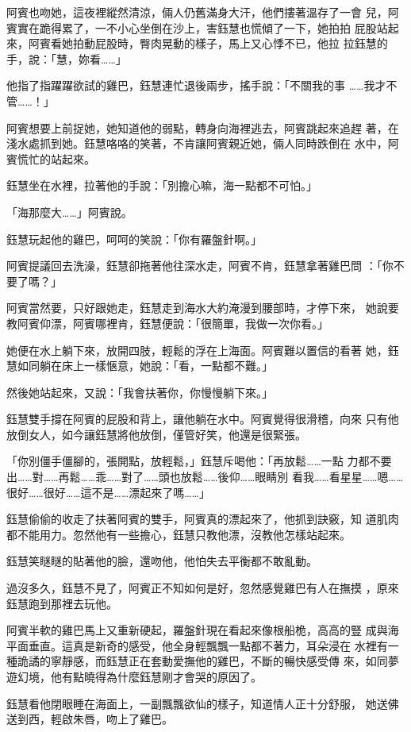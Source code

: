 阿賓也吻她，這夜裡縱然清涼，倆人仍舊滿身大汗，他們摟著溫存了一會
兒，阿賓實在跪得累了，一不小心坐倒在沙上，害鈺慧也慌傾了一下，她拍拍
屁股站起來，阿賓看她拍動屁股時，臀肉晃動的樣子，馬上又心悸不已，他拉
拉鈺慧的手，說：「慧，妳看……」

他指了指躍躍欲試的雞巴，鈺慧連忙退後兩步，搖手說：「不關我的事
……我才不管……！」

阿賓想要上前捉她，她知道他的弱點，轉身向海裡逃去，阿賓跳起來追趕
著，在淺水處抓到她。鈺慧咯咯的笑著，不肯讓阿賓親近她，倆人同時跌倒在
水中，阿賓慌忙的站起來。

鈺慧坐在水裡，拉著他的手說：「別擔心嘛，海一點都不可怕。」

「海那麼大……」阿賓說。

鈺慧玩起他的雞巴，呵呵的笑說：「你有羅盤針啊。」

阿賓提議回去洗澡，鈺慧卻拖著他往深水走，阿賓不肯，鈺慧拿著雞巴問
：「你不要了嗎？」

阿賓當然要，只好跟她走，鈺慧走到海水大約淹漫到腰部時，才停下來，
她說要教阿賓仰漂，阿賓哪裡肯，鈺慧便說：「很簡單，我做一次你看。」

她便在水上躺下來，放開四肢，輕鬆的浮在上海面。阿賓難以置信的看著
她，鈺慧如同躺在床上一樣愜意，她說：「看，一點都不難。」

然後她站起來，又說：「我會扶著你，你慢慢躺下來。」

鈺慧雙手撐在阿賓的屁股和背上，讓他躺在水中。阿賓覺得很滑稽，向來
只有他放倒女人，如今讓鈺慧將他放倒，僅管好笑，他還是很緊張。

「你別僵手僵腳的，張開點，放輕鬆，」鈺慧斥喝他：「再放鬆……一點
力都不要出……對……再鬆……乖……對了……頭也放鬆……後仰……眼睛別
看我……看星星……嗯……很好……很好……這不是……漂起來了嗎……」

鈺慧偷偷的收走了扶著阿賓的雙手，阿賓真的漂起來了，他抓到訣竅，知
道肌肉都不能用力。忽然他有一些擔心，鈺慧只教他漂，沒教他怎樣站起來。

鈺慧笑瞇瞇的貼著他的臉，還吻他，他怕失去平衡都不敢亂動。

過沒多久，鈺慧不見了，阿賓正不知如何是好，忽然感覺雞巴有人在撫摸
，原來鈺慧跑到那裡去玩他。

阿賓半軟的雞巴馬上又重新硬起，羅盤針現在看起來像根船桅，高高的豎
成與海平面垂直。這真是新奇的感受，他全身輕飄飄一點都不著力，耳朵浸在
水裡有一種詭譎的寧靜感，而鈺慧正在套動愛撫他的雞巴，不斷的暢快感受傳
來，如同夢遊幻境，他有點曉得為什麼鈺慧剛才會哭的原因了。

鈺慧看他閉眼睡在海面上，一副飄飄欲仙的樣子，知道情人正十分舒服，
她送佛送到西，輕啟朱唇，吻上了雞巴。

